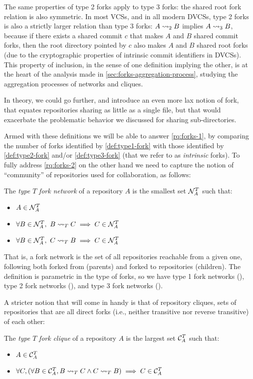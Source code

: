 The same properties of type 2 forks apply to type 3 forks: the shared root fork
relation is also symmetric. In most \glspl{VCS}, and in all modern
\glspl{DVCS}, type 2 forks is also a strictly larger relation than type 3
forks: $A\rightsquigarrow_2 B$ implies $A\rightsquigarrow_3 B$, because if there exists a shared
commit $c$ that makes $A$ and $B$ shared commit forks, then the root directory
pointed by $c$ also makes $A$ and $B$ shared root forks (due to the
cryptographic properties of intrinsic commit identifiers in \glspl{DVCS}).
This property of inclusion, in the sense of one definition implying the other,
is at the heart of the analysis made in \cref{sec:forks-aggregation-process},
studying the aggregation processes of networks and cliques.

In theory, we could go further, and introduce an even more lax notion of fork,
that equates repositories sharing as little as a single file, but that would
exacerbate the problematic behavior we discussed for sharing sub-directories.

Armed with these definitions we will be able to answer \cref{rq:forks-1}, by
comparing the number of forks identified by \cref{def:type1-fork} with those
identified by \cref{def:type2-fork} and/or \cref{def:type3-fork} (that we refer
to as \emph{intrinsic} forks).
To fully address \cref{rq:forks-2} on the other hand we need to capture the
notion of ``community'' of repositories used for collaboration, as follows:
\begin{definition}%
  \label{def:fork-network}
  The \emph{type $T$ fork network} of a repository $A$ is the smallest set
  $\mathcal{N}^T_A$ such that:
  \begin{itemize}
  \item $A\in\mathcal{N}^T_A$
  \item $\forall B\in\mathcal{N}^T_A,~B\rightsquigarrow_T C \implies C\in\mathcal{N}^T_A$
  \item $\forall B\in\mathcal{N}^T_A,~C\rightsquigarrow_T B \implies C\in\mathcal{N}^T_A$
  \end{itemize}
\end{definition}

That is, a fork network is the set of all repositories reachable from a given
one, following both forked from (parents) and forked to repositories
(children). The definition is parametric in the type of forks, so we have type
1 fork networks (\networkI), type 2 fork networks (\networkII), and type 3 fork
networks (\networkIII).

A stricter notion that will come in handy is that of repository cliques, sets
of repositories that are all direct forks (i.e., neither transitive nor reverse
transitive) of each other:
\begin{definition}%
  \label{def:fork-clique}
  The \emph{type $T$ fork clique} of a repository $A$ is the largest set
  $\mathcal{C}^T_A$ such that:
  \begin{itemize}
  \item $A\in\mathcal{C}^T_A$
  \item $\forall C, (\forall B \in \mathcal{C}^T_A, B\rightsquigarrow_T C \land C\rightsquigarrow_T B) \implies C\in\mathcal{C}^T_A$
  \end{itemize}
\end{definition}

